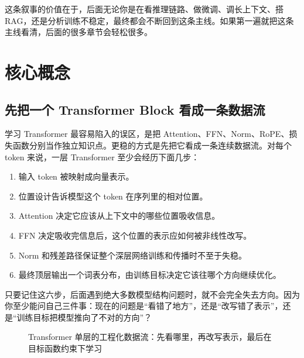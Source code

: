 这条叙事的价值在于，后面无论你是在看推理链路、做微调、调长上下文、搭 RAG，还是分析训练不稳定，最终都会不断回到这条主线。如果第一遍就把这条主线看清，后面的很多章节会轻松很多。

\section{核心概念}
\subsection{先把一个 Transformer Block 看成一条数据流}
学习 Transformer 最容易陷入的误区，是把 Attention、FFN、Norm、RoPE、损失函数分别当作独立知识点。更稳的方式是先把它看成一条连续数据流。对每个 token 来说，一层 Transformer 至少会经历下面几步：
\begin{enumerate}
  \item 输入 token 被映射成向量表示。
  \item 位置设计告诉模型这个 token 在序列里的相对位置。
  \item Attention 决定它应该从上下文中的哪些位置吸收信息。
  \item FFN 决定吸收完信息后，这个位置的表示应如何被非线性改写。
  \item Norm 和残差路径保证整个深层网络训练和传播时不至于失稳。
  \item 最终顶层输出一个词表分布，由训练目标决定它该往哪个方向继续优化。
\end{enumerate}

只要记住这六步，后面遇到绝大多数模型结构问题时，就不会完全失去方向。因为你至少能问自己三件事：现在的问题是“看错了地方”，还是“改写错了表示”，还是“训练目标把模型推向了不对的方向”？

\begin{figure}[H]
\centering
{}
\caption{Transformer 单层的工程化数据流：先看哪里，再改写表示，最后在目标函数约束下学习}
\label{fig:transformer-block}
\end{figure}

